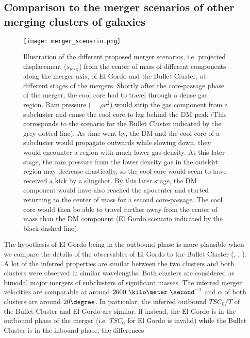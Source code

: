 \subsection{Comparison to the merger scenarios of other merging clusters of galaxies}

\begin{figure}
	\texttt{[image: merger\_scenario.png]}
	\caption{Illustration of the different proposed merger scenarios, i.e. projected displacement
		($s_{proj}$) from the center of mass of different components along the
		merger axis, of El
		Gordo and the Bullet Cluster, at different stages of the mergers.  
		Shortly after the core-passage
		phase of the merger, the cool core had to travel through a dense gas region.
		Ram pressure ($=\rho v^2$) would strip the gas component from a subcluster and cause the
		cool core to lag behind the DM peak (This corresponds to the scenario
		for the Bullet Cluster indicated by the grey dotted line). As time went by, the DM and the cool core of
		a subcluster would propagate outwards while slowing down, they would
		encounter a region with much lower gas density. At this later stage, 
		the ram pressure from the lower density gas in the
		outskirt region may decrease drastically, so the cool core would seem
		to have received a kick by a slingshot. By this
		later stage, the DM component would have also reached the
		apocenter and started returning to the center of mass for a second
		core-passage. The cool core would then be able to travel further away from
		the center of mass than the DM component (El Gordo scenario indicated
		by the black dashed line).
	\label{fig:merger_scenario}}
\end{figure}
The hypothesis of El Gordo being in the outbound phase is more plausible when
we compare the details of the observables of El Gordo to the Bullet
Cluster (\citealt{Bradac2006b}, \citealt{Springel2007},
\citealt{Mastropietro2008a}).
A lot of the inferred properties are similar between the two clusters and
both clusters were observed in similar wavelengths. Both clusters are
considered as bimodal major mergers of subclusters of significant masses. The inferred
merger velocities are comparable at around $2600~\kilo\meter~\second^{-1}$
and $\alpha$ of both clusters are around $20 \degree$. 
In particular, the inferred outbound $TSC_0 / T$ of the Bullet Cluster and El Gordo
are similar. If instead, the El Gordo
is in the outbound phase of the merger (i.e. $TSC_0$ for El Gordo is
invalid) while the Bullet Cluster is in the inbound phase, the differences
